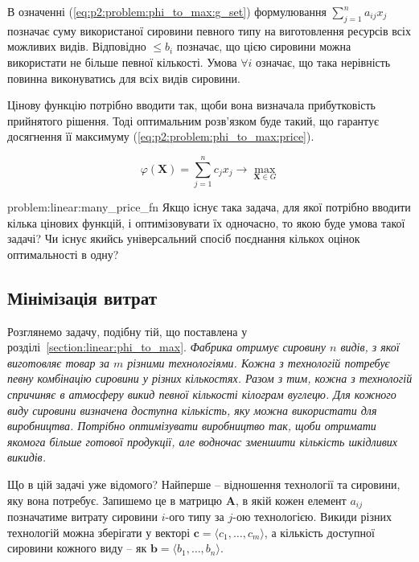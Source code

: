 \documentclass[\main/book.tex]{subfiles}
\begin{document}
В означенні (\ref{eq:p2:problem:phi_to_max:g_set}) фор\-му\-лю\-ва\-ння ${\sum_{j=1}^n a_{ij} x_j}$ позначає суму використаної сировини певного типу на виготовлення ресурсів всіх можливих видів. Відповідно \flqq{}$\leq b_i$\frqq{} позначає, що цією сировини можна використати не більше певної кількості. Умова $\forall i$ означає, що така нерівність повинна виконуватись для всіх видів сировини.

Цінову функцію потрібно вводити так, щоби вона визначала прибутковість прийнятого рішення. Тоді оптимальним розв'язком буде такий, що гарантує досягнення її максимуму (\ref{eq:p2:problem:phi_to_max:price}).

\begin{equation}
 \varphi(\mathbf{X}) =
 \sum_{j=1}^n c_j x_j \rightarrow
 \max_{\mathbf{X} \in G}
 \label{eq:p2:problem:phi_to_max:price}
\end{equation}

\begin{problem}{problem:linear:many_price_fn}
 Якщо існує така задача, для якої потрібно вводити кілька цінових функцій, і оптимізовувати їх одночасно, то якою буде умова такої задачі? Чи існує якийсь універсальний спосіб поєднання кількох оцінок оптимальності в одну?
\end{problem}

\subsection{Мінімізація витрат}

Розглянемо задачу, подібну тій, що поставлена у розділі~\ref{section:linear:phi_to_max}. \textit{Фабрика отримує сировину $n$ видів, з якої виготовляє товар за $m$ різними тех\-но\-ло\-гі\-я\-ми. Кожна з технологій потребує певну комбінацію сировини у різних кількостях. Разом з тим, кожна з технологій спричиняє в атмосферу викид певної кількості кілограм вуглецю. Для кожного виду сировини визначена доступна кількість, яку можна використати для виробництва. Потрібно оптимізувати виробництво так, щоби отримати якомога більше готової продукції, але водночас зменшити кількість шкідливих викидів.}

Що в цій задачі уже відомого? Найперше -- відношення технології та сировини, яку вона потребує. Запишемо це в матрицю $\mathbf{A}$, в якій кожен елемент $a_{ij}$ позначатиме витрату сировини $i$-ого типу за $j$-ою технологією. Викиди різних технологій можна зберігати у векторі $\mathbf{c} = \langle c_1, \ldots, c_m \rangle$, а кількість доступної сировини кожного виду -- як $\mathbf{b} = \langle b_1, \ldots, b_n \rangle$.
\end{document}
